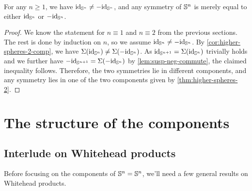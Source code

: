 \documentclass[english,a4paper]{lmcs}
\begin{document}
\begin{cor}\label{cor:id-not-minus-id}
	For any $n \geq 1$, we have $\mathord{\mathrm{id}}_{{\mathbb S^{n}}} \neq -\mathord{\mathrm{id}}_{{\mathbb S^{n}}}$, and any symmetry of ${\mathbb S^{n}}$ is merely equal to either $\mathord{\mathrm{id}}_{{\mathbb S^{n}}}$ or $-\mathord{\mathrm{id}}_{{\mathbb S^{n}}}$.
\end{cor}
\begin{proof}
	We know the statement for $n \equiv 1$ and $n \equiv 2$ from the previous sections.
	The rest is done by induction on $n$, so we assume $\mathord{\mathrm{id}}_{{\mathbb S^{n}}} \neq -\mathord{\mathrm{id}}_{{\mathbb S^{n}}}$.
	By
	\cref{cor:higher-spheres-2-comp}, we have $\operatorname{\Sigma}(\mathord{\mathrm{id}}_{{\mathbb S^{n}}}) \neq \operatorname{\Sigma}(-\mathord{\mathrm{id}}_{{\mathbb S^{n}}})$.
	As $\mathord{\mathrm{id}}_{{\mathbb S^{n+1}}} = \operatorname{\Sigma}(\mathord{\mathrm{id}}_{{\mathbb S^{n}}})$ trivially holds and
	we further have $-\mathord{\mathrm{id}}_{{\mathbb S^{n+1}}} = \operatorname{\Sigma}(-\mathord{\mathrm{id}}_{{\mathbb S^{n}}})$
	by \cref{lem:susp-neg-commute}, the claimed inequality follows.
	Therefore, the two symmetries lie in different components, and any symmetry lies in one of the two components given by \cref{thm:higher-spheres-2}.
\end{proof}

\section{The structure of the components}
\label{sec:structure-components}

\subsection{Interlude on Whitehead products}
\label{sec:whitehead-interlude}

Before focusing on the components of ${\mathbb S^{n}} = {\mathbb S^{n}}$,
we'll need a few general results on Whitehead products.
\end{document}
